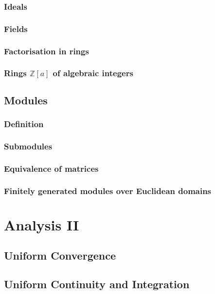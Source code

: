 \documentclass[12pt]{book}
\newcommand{\ZZ}{\mathbb Z}
\theoremstyle{definition}
\theoremstyle{remark}
\begin{document}
			\subsection{Ideals}
			
			\subsection{Fields}
			
			\subsection{Factorisation in rings}
			
			\subsection{Rings $\ZZ[a]$ of algebraic integers}
		\section{Modules}
			\subsection{Definition}
			
			\subsection{Submodules}
			
			\subsection{Equivalence of matrices}
			
			\subsection{Finitely generated modules over Euclidean domains}
	\chapter{Analysis II}
		\section{Uniform Convergence}
		
		\section{Uniform Continuity and Integration}
		
\end{document}
